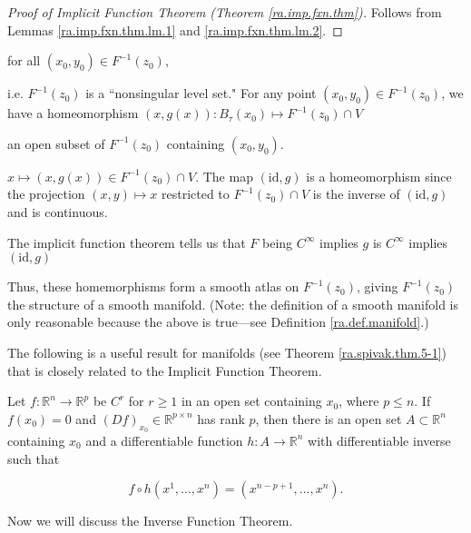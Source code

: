 \begin{proof}[Proof of Implicit Function Theorem (Theorem \ref{ra.imp.fxn.thm})]

Follows from Lemmas \ref{ra.imp.fxn.thm.lm.1} and \ref{ra.imp.fxn.thm.lm.2}.

\end{proof}

for all \((x_0, y_0) \in F^{-1}(z_0)\), 

i.e. \(F^{-1}(z_0)\) is a ``nonsingular level set." For any point \((x_0, y_0) \in F^{-1}(z_0)\), we have a homeomorphism \((x, g(x)) : B_\tau(x_0) \mapsto F^{-1}(z_0) \cap V\)

an open subset of \(F^{-1}(z_0)\) containing \((x_0, y_0)\). 

\(x \mapsto (x, g(x)) \in F^{-1}(z_0) \cap V \). The map \( ( \text{id}, g)\) is a homeomorphism since the projection \((x, y) \mapsto x\) restricted to \(F^{-1}(z_0) \cap V\) is the inverse of \( ( \text{id}, g)\) and is continuous. 

The implicit function theorem tells us that \(F\) being \(C^\infty\) implies \(g \) is \(C^\infty\) implies \( ( \text{id}, g)\) 

Thus, these homemorphisms form a smooth atlas on \(F^{-1}(z_0)\), giving \(F^{-1}(z_0)\) the structure of a smooth manifold. (Note: the definition of a smooth manifold is only reasonable because the above is true---see Definition \ref{ra.def.manifold}.)

The following is a useful result for manifolds (see Theorem \ref{ra.spivak.thm.5-1}) that is closely related to the Implicit Function Theorem.

\begin{theorem}\label{ra.spivak.thm.2-13}

Let \(f: \mathbb{R}^n \to \mathbb{R}^p\) be \(C^r\) for \(r \geq 1\) in an open set containing \(x_0\), where \(p \leq n\). If \(f(x_0) = 0\) and \((Df)_{x_0} \in \mathbb{R}^{p \times n}\) has rank \(p\), then there is an open set \(A \subset \mathbb{R}^n\) containing \(x_0\) and a differentiable function \(h: A \to \mathbb{R}^n\) with differentiable inverse such that 

\[
f \circ h(x^1, \ldots, x^n) = (x^{n-p+1}, \ldots, x^n).
\]

\end{theorem}

Now we will discuss the Inverse Function Theorem.

